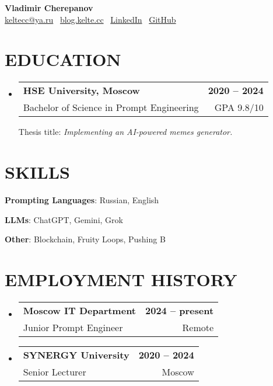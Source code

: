 \documentclass[letterpaper,11pt]{article}
\makeatletter
\newcommand{\resumeSubheading}[4]{
  \vspace{-2pt}\item
    \begin{tabular*}{1.0\textwidth}[t]{l@{\extracolsep{\fill}}r}
      \textbf{{#1}} & \textbf{{\small #2}} \\
      
      {#3} & {\small #4} \\
    \end{tabular*}\vspace{-4pt}
}
\newcommand{\resumeSubHeadingListStart}{\begin{itemize}[leftmargin=0.0in, label={}]}
\newcommand{\resumeSubHeadingListEnd}{\end{itemize}}
\makeatother
\begin{document}
\begin{center}
  {\huge \textbf{Vladimir Cherepanov}} \\
   \href{mailto:keltecc@ya.ru}{keltecc@ya.ru}
  \textbullet\
   \href{https://blog.kelte.cc/}{blog.kelte.cc}
   \textbullet\ 
  \href{https://linkedin.com/in/keltecc/}{LinkedIn} 
  \textbullet\
  \href{https://github.com/keltecc}{GitHub} \\
\end{center}

\section{EDUCATION}
  \resumeSubHeadingListStart
    \resumeSubheading
      {HSE University, Moscow}{2020 -- 2024}
      {Bachelor of Science in Prompt Engineering}{GPA 9.8/10}
      \par Thesis title: \emph{Implementing an AI-powered memes generator.}
  \resumeSubHeadingListEnd

\section{SKILLS}
 \begin{itemize}[leftmargin=0.2in]
    \small{\item{
     \textbf{Prompting Languages}{: Russian, English }
     \vspace{-5pt}
     \item{\textbf{LLMs}{: ChatGPT, Gemini, Grok}}
     \vspace{-5pt}
     \item{\textbf{Other}{: Blockchain, Fruity Loops, Pushing B}}
    }}
 \end{itemize}

\section{EMPLOYMENT HISTORY}

  \resumeSubHeadingListStart
    \resumeSubheading
      {Moscow IT Department}{2024 -- present} 
      {Junior Prompt Engineer}{Remote}
\vspace{-4pt}
    \resumeSubheading
      {SYNERGY University}{2020 -- 2024}
      {Senior Lecturer}{Moscow}
  \resumeSubHeadingListEnd
\end{document}
